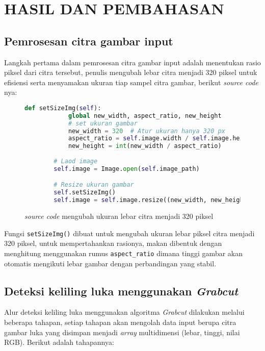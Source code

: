 
\chapter{HASIL DAN PEMBAHASAN}

\section{Pemrosesan citra gambar input}
Langkah pertama dalam pemrosesan citra gambar input adalah menentukan rasio piksel 
dari citra tersebut, penulis mengubah lebar citra menjadi 320 piksel untuk efisiensi 
serta menyamakan ukuran tiap sampel citra gambar, berikut \emph{source code} nya:

\begin{figure}[H]
	\begin{lstlisting}[language=Python, basicstyle=\tiny]
		def setSizeImg(self):
			global new_width, aspect_ratio, new_height
			# set ukuran gambar
			new_width = 320  # Atur ukuran hanya 320 px
			aspect_ratio = self.image.width / self.image.height
			new_height = int(new_width / aspect_ratio)
		
		# Laod image
		self.image = Image.open(self.image_path)

		# Resize ukuran gambar
		self.setSizeImg() 
		self.image = self.image.resize((new_width, new_height)) 
	\end{lstlisting}
	\caption{\emph{source code} mengubah ukuran lebar citra menjadi 320 piksel}
	\label{img:resize_gambar}
\end{figure}

Fungsi \texttt{setSizeImg()} dibuat untuk mengubah ukuran lebar piksel citra 
menjadi 320 piksel, untuk mempertahankan rasionya, makan dibentuk dengan menghitung
menggunakan rumus \texttt{aspect\_ratio} dimana tinggi gambar akan otomatis mengikuti lebar gambar 
dengan perbandingan yang stabil.

\section{Deteksi keliling luka menggunakan \emph{Grabcut}}
Alur deteksi keliling luka menggunakan algoritma \emph{Grabcut} dilakukan melalui
beberapa tahapan, setiap tahapan akan mengolah data input berupa citra gambar luka 
yang disimpan menjadi \emph{array} multidimensi (lebar, tinggi, nilai RGB).
Berikut adalah tahapannya:


